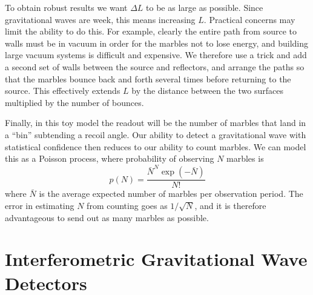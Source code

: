 To obtain robust results we want $\Delta L$ to be as large as
possible.  Since gravitational waves are week, this means increasing
$L$.  Practical concerns may limit the ability to do this.  For
example, clearly the entire path from source to walls must be in
vacuum in order for the marbles not to lose energy, and building large
vacuum systems is difficult and expensive.  We therefore use a trick
and add a second set of walls between the source and reflectors, and
arrange the paths so that the marbles bounce back and forth several
times before returning to the source.  This effectively extends $L$ by
the distance between the two surfaces multiplied by the number of
bounces.

Finally, in this toy model the readout will be the number of marbles
that land in a ``bin'' subtending a recoil angle.  Our ability to
detect a gravitational wave with statistical confidence then reduces
to our ability to count marbles.  We can model this as a Poisson
process, where probability of observing $N$ marbles is 
%
\begin{equation*}
p(N) = \frac{\bar{N}^N \exp(-\bar{N})} {N!}
\end{equation*}
%
where $\bar{N}$ is the average expected number of marbles per
observation period.  The error in estimating $N$ from counting goes as
$1/\sqrt{N}$, and it is therefore advantageous to send out as many 
marbles as possible.

\section{Interferometric Gravitational Wave Detectors}

